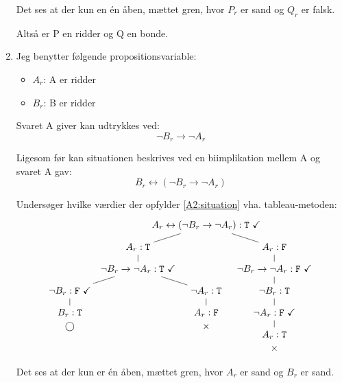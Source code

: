 \begin{enumerate}
  Det ses at der kun en én åben, mættet gren, hvor $P_r$ er sand og $Q_r$ er falsk.

  Altså er P en ridder og Q en bonde.

  \item
  Jeg benytter følgende propositionsvariable:
  \begin{itemize}
    \item $A_r$: A er ridder
    \item $B_r$: B er ridder
  \end{itemize}

  Svaret A giver kan udtrykkes ved:
  \begin{equation}
    \lnot B_r \rightarrow \lnot A_r
  \end{equation}

  Ligesom før kan situationen beskrives ved en biimplikation mellem A og svaret A gav:
  \begin{equation}
    \label{A2:situation}
    B_r \leftrightarrow \left( \lnot B_r \rightarrow \lnot A_r \right)
  \end{equation}

  Undersøger hvilke værdier der opfylder \eqref{A2:situation} vha. tableau-metoden:
  \begin{equation*}
    \begin{tikzpicture}[level distance=8mm,sibling distance=50mm]
      \node {$A_r \leftrightarrow \left( \lnot B_r \rightarrow \lnot A_r \right) : \T\ \checkmark$}
      child {
        node {$A_r : \T$}
        child {
          node {$\lnot B_r \rightarrow \lnot A_r : \T\ \checkmark$}
          child {
            node {$\lnot B_r : \F\ \checkmark$}
            child {
              node {$B_r : \T$}
              \open
            }
          }
          child {
            node {$\lnot A_r : \T$}
            child {
              node {$A_r : \F$}
              \closed
            }
          }
        }
      }
      child {
        node {$A_r : \F$}
        child {
          node {$\lnot B_r \rightarrow \lnot A_r : \F\ \checkmark$}
          child {
            node {$\lnot B_r : \T$}
            child {
              node {$\lnot A_r : \F\ \checkmark$}
              child {
                node {$A_r : \T$}
                \closed
              }
            }
          }
        }
      };
    \end{tikzpicture}
  \end{equation*}

  Det ses at der kun er én åben, mættet gren, hvor $A_r$ er sand og $B_r$ er sand.


\end{enumerate}
